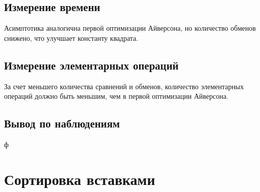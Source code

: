 \documentclass[11pt]{article}
\begin{document}
\setcounter{subsection}{0}
\subsection{Измерение времени}

\begin{center}
\end{center}
{ \hspace*{\fill} }

\begin{center}
\end{center}
{ \hspace*{\fill} }

Асимптотика аналогична первой оптимизации Айверсона, но количество обменов снижено, что
улучшает константу квадрата.

\subsection{Измерение элементарных операций}

\begin{center}
\end{center}
{ \hspace*{\fill} }

\begin{center}
\end{center}
{ \hspace*{\fill} }

За счет меньшего количества сравнений и обменов, количество элементарных операций должно
быть меньшим, чем в первой оптимизации Айверсона.

\subsection{Вывод по наблюдениям}

ф

\newpage

\setcounter{section}{5}
\section*{\centering Сортировка вставками}
\end{document}
